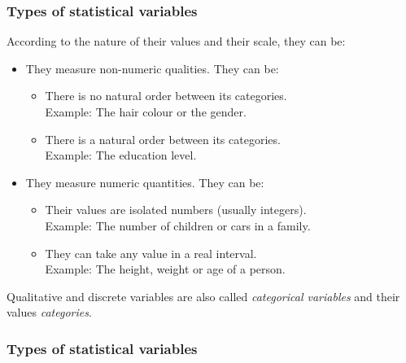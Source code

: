 \begin{frame}
\frametitle{Types of statistical variables}
According to the nature of their values and their scale, they can be:
\begin{itemize}
\item {} They measure non-numeric qualities.
They can be:
\begin{itemize}
\item {} There is no natural order between its categories.\\
Example: The hair colour or the gender.
\item {} There is a natural order between its categories. \\
Example: The education level.
\end{itemize}
\item {} They measure numeric quantities.
They can be:
\begin{itemize}
\item {} Their values are isolated numbers (usually integers).\\
Example: The number of children or cars in a family.
\item {} They can take any value in a real interval.\\
Example: The height, weight or age of a person.
\end{itemize}
\end{itemize}
Qualitative and discrete variables are also called \emph{categorical variables} and their values \emph{categories}.
\end{frame}


\begin{frame}
\frametitle{Types of statistical variables}
\begin{center}
\resizebox{\textwidth}{!}{}
\end{center}
\end{frame}



